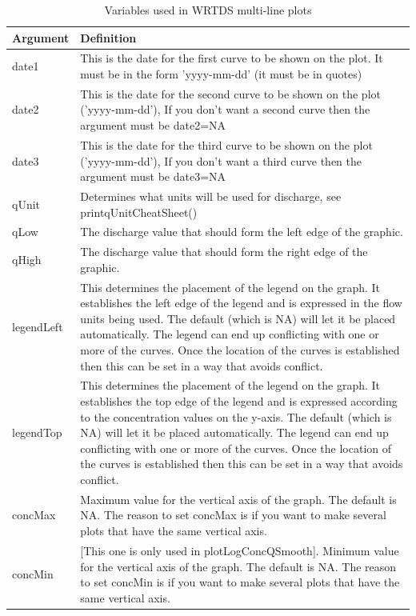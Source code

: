 \documentclass[a4paper,11pt]{article}\usepackage{graphicx, color}
\begin{document}
\begin{table}[ht]
\caption{Variables used in WRTDS multi-line plots  \label{tab:wrtdsMultiVariables}}
\begin{tabularx}{\textwidth}{lX}
\hline
  \textbf{Argument} & \textbf{Definition} \\
\hline
date1 & This is the date for the first curve to be shown on the plot.  It must be in the form 'yyyy-mm-dd' (it must be in quotes)\\
date2 & This is the date for the second curve to be shown on the plot ('yyyy-mm-dd'), If you don't want a second curve then the argument must be date2=NA\\
date3 & This is the date for the third curve to be shown on the plot ('yyyy-mm-dd'), If you don't want a third curve then the argument must be date3=NA\\
qUnit & Determines what units will be used for discharge, see printqUnitCheatSheet() \\
qLow & The discharge value that should form the left edge of the graphic. \\
qHigh & The discharge value that should form the right edge of the graphic. \\
legendLeft & This determines the placement of the legend on the graph.  It establishes the left edge of the legend and is expressed in the flow units being used.  The default (which is NA) will let it be placed automatically.  The legend can end up conflicting with one or more of the curves.  Once the location of the curves is established then this can be set in a way that avoids conflict.\\
legendTop & This determines the placement of the legend on the graph.  It establishes the top edge of the legend and is expressed according to the concentration values on the y-axis.  The default (which is NA) will let it be placed automatically.  The legend can end up conflicting with one or more of the curves.  Once the location of the curves is established then this can be set in a way that avoids conflict.\\
concMax & Maximum value for the vertical axis of the graph.  The default is NA.  The reason to set concMax is if you want to make several plots that have the same vertical axis.\\
concMin & [This one is only used in plotLogConcQSmooth].  Minimum value for the vertical axis of the graph.  The default is NA.  The reason to set concMin is if you want to make several plots that have the same vertical axis.\\

\end{tabularx}
\end{table}
\end{document}
